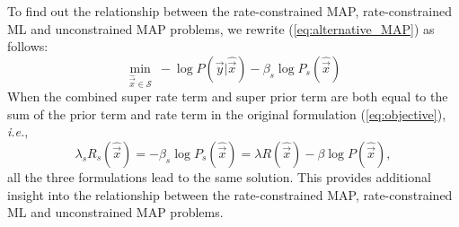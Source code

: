 To find out the relationship between the rate-constrained MAP, rate-constrained ML and unconstrained MAP problems, we rewrite (\ref{eq:alternative_MAP}) as follows:
\begin{equation}
\underset{\hat{\vec{x}}\in  \mathcal{S}}{\min}\ -\log P(\vec{y}|\hat{\vec{x}}) - \beta_s \log P_s(\hat{\vec{x}})
\end{equation}
When the combined super rate term and super prior term are both equal to the sum of the prior term and rate term in the original formulation (\ref{eq:objective}), \textit{i.e.}, 
\begin{equation}
\lambda_s R_s(\hat{\vec{x}}) = -\beta_s \log P_s(\hat{\vec{x}}) = \lambda R(\hat{\vec{x}}) - \beta \log P(\hat{\vec{x}}),
\end{equation}
all the three formulations lead to the same solution.
This provides additional insight into the relationship between the rate-constrained MAP, rate-constrained ML and unconstrained MAP problems.
